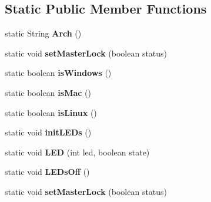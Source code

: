 \subsection*{Static Public Member Functions}
\begin{DoxyCompactItemize}
\item 
\hypertarget{classCASUAL_1_1Statics_af00bb800d95d7d7092aad638646db489}{static String {\bfseries Arch} ()}\label{classCASUAL_1_1Statics_af00bb800d95d7d7092aad638646db489}

\item 
\hypertarget{classCASUAL_1_1Statics_a67a4b3fedd37e436179e0a9e04bfa2f6}{static void {\bfseries set\-Master\-Lock} (boolean status)}\label{classCASUAL_1_1Statics_a67a4b3fedd37e436179e0a9e04bfa2f6}

\item 
\hypertarget{classCASUAL_1_1Statics_a1ae296f3d8766af35c4a66e0659c7ecb}{static boolean {\bfseries is\-Windows} ()}\label{classCASUAL_1_1Statics_a1ae296f3d8766af35c4a66e0659c7ecb}

\item 
\hypertarget{classCASUAL_1_1Statics_a24735f0291de40780e6467e6f8b9f641}{static boolean {\bfseries is\-Mac} ()}\label{classCASUAL_1_1Statics_a24735f0291de40780e6467e6f8b9f641}

\item 
\hypertarget{classCASUAL_1_1Statics_a01f5cc045ea64d46ed53ebe32124fdfb}{static boolean {\bfseries is\-Linux} ()}\label{classCASUAL_1_1Statics_a01f5cc045ea64d46ed53ebe32124fdfb}

\item 
\hypertarget{classCASUAL_1_1Statics_a7a390a2f8f063be52992863aa2819326}{static void {\bfseries init\-L\-E\-Ds} ()}\label{classCASUAL_1_1Statics_a7a390a2f8f063be52992863aa2819326}

\item 
\hypertarget{classCASUAL_1_1Statics_a095a244e00ab97cdddb8127347fcb402}{static void {\bfseries L\-E\-D} (int led, boolean state)}\label{classCASUAL_1_1Statics_a095a244e00ab97cdddb8127347fcb402}

\item 
\hypertarget{classCASUAL_1_1Statics_a65f2ed15dbae9bc8d73aba7ad546ce6f}{static void {\bfseries L\-E\-Ds\-Off} ()}\label{classCASUAL_1_1Statics_a65f2ed15dbae9bc8d73aba7ad546ce6f}

\item 
\hypertarget{classCASUAL_1_1Statics_a67a4b3fedd37e436179e0a9e04bfa2f6}{static void {\bfseries set\-Master\-Lock} (boolean status)}\label{classCASUAL_1_1Statics_a67a4b3fedd37e436179e0a9e04bfa2f6}


\end{DoxyCompactItemize}
